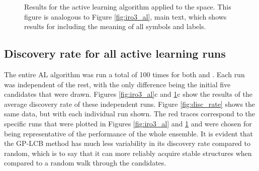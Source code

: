 \begin{figure}[!htb]
\centering
{}
\caption{\label{fig:iro2_al}
%
Results for the active learning algorithm applied to the \IrOtwo space.
%
This figure is analogous to Figure \ref{fig:iro3_al}, main text, which shows results for \IrOthree including the meaning of all symbols and labels.
}
\end{figure}


\subsection{Discovery rate for all active learning runs}
%

%
%
The entire AL algorithm was run a total of \num{100} times for both \IrOtwo and \IrOthree.
%
Each run was independent of the rest, with the only difference being the initial five candidates that were drawn.
%
Figures \ref{fig:iro3_al}c and \ref{fig:iro2_al}c show the results of the average discovery rate of these independent runs.
%
Figure \ref{fig:disc_rate} shows the same data, but with each individual run shown.
%
The red traces correspond to the specific runs that were plotted in Figures \ref{fig:iro3_al} and \ref{fig:iro2_al} and were chosen for being representative of the performance of the whole ensemble.
%
It is evident that the GP-LCB method has much less variability in its discovery rate compared to random, which is to say that it can more reliably acquire stable structures when compared to a random walk through the candidates.

